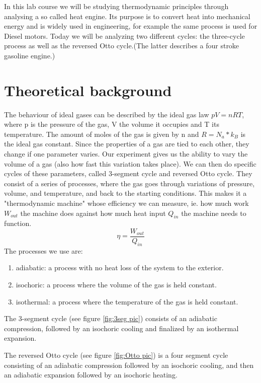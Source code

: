 \documentclass{scrartcl}
\begin{document}
In this lab course we will be studying thermodynamic principles through analysing a so called heat engine. Its purpose is to convert heat into mechanical energy and is widely used in engineering, for example the same process is used for Diesel motors.
Today we will be analyzing two different cycles: the three-cycle process as well as the reversed Otto cycle.(The latter describes a four stroke gasoline engine.)

\section{Theoretical background}

The behaviour of ideal gases can be described by the ideal gas law $pV = nRT$, where p is the pressure of the gas, V the volume it occupies and T its temperature. The amount of moles of the gas is given by n and $R = N_a *k_B$ is the ideal gas constant. Since the properties of a gas are tied to each other, they change if one parameter varies. Our experiment gives us the ability to vary the volume of a gas (also how fast this variation takes place). We can then do specific cycles of these parameters, called 3-segment cycle and reversed Otto cycle. They consist of a series of processes, where the gas goes through variations of pressure, volume, and temperature, and back to the starting conditions. This makes it a "thermodynamic machine" whose efficiency we can measure, ie. how much work $W_{out}$ the machine does against how much heat input $Q_{in}$ the machine needs to function. \begin{equation} \eta = \frac{W_{out}}{Q_{in}} \end{equation} The processes we use are: \begin{enumerate} \item adiabatic: a process with no heat loss of the system to the exterior. \item isochoric: a process where the volume of the gas is held constant. \item isothermal: a process where the temperature of the gas is held constant. \end{enumerate} 

The 3-segment cycle (see figure \ref{fig:3seg pic}) consists of an adiabatic compression, followed by an isochoric cooling and finalized by an isothermal expansion. 

The reversed Otto cycle (see figure \ref{fig:Otto pic}) is a four segment cycle consisting of an adiabatic compression followed by an isochoric cooling, and then an adiabatic expansion followed by an isochoric heating.
\end{document}
